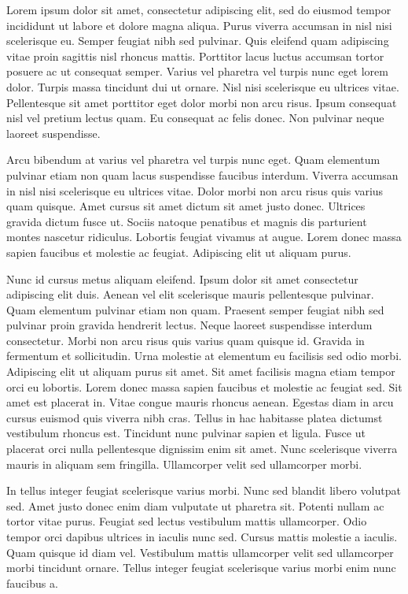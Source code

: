 Lorem ipsum dolor sit amet, consectetur adipiscing elit, sed do eiusmod tempor incididunt ut labore et dolore magna aliqua. Purus viverra accumsan in nisl nisi scelerisque eu. Semper feugiat nibh sed pulvinar. Quis eleifend quam adipiscing vitae proin sagittis nisl rhoncus mattis. Porttitor lacus luctus accumsan tortor posuere ac ut consequat semper. Varius vel pharetra vel turpis nunc eget lorem dolor. Turpis massa tincidunt dui ut ornare. Nisl nisi scelerisque eu ultrices vitae. Pellentesque sit amet porttitor eget dolor morbi non arcu risus. Ipsum consequat nisl vel pretium lectus quam. Eu consequat ac felis donec. Non pulvinar neque laoreet suspendisse.

Arcu bibendum at varius vel pharetra vel turpis nunc eget. Quam elementum pulvinar etiam non quam lacus suspendisse faucibus interdum. Viverra accumsan in nisl nisi scelerisque eu ultrices vitae. Dolor morbi non arcu risus quis varius quam quisque. Amet cursus sit amet dictum sit amet justo donec. Ultrices gravida dictum fusce ut. Sociis natoque penatibus et magnis dis parturient montes nascetur ridiculus. Lobortis feugiat vivamus at augue. Lorem donec massa sapien faucibus et molestie ac feugiat. Adipiscing elit ut aliquam purus.

Nunc id cursus metus aliquam eleifend. Ipsum dolor sit amet consectetur adipiscing elit duis. Aenean vel elit scelerisque mauris pellentesque pulvinar. Quam elementum pulvinar etiam non quam. Praesent semper feugiat nibh sed pulvinar proin gravida hendrerit lectus. Neque laoreet suspendisse interdum consectetur. Morbi non arcu risus quis varius quam quisque id. Gravida in fermentum et sollicitudin. Urna molestie at elementum eu facilisis sed odio morbi. Adipiscing elit ut aliquam purus sit amet. Sit amet facilisis magna etiam tempor orci eu lobortis. Lorem donec massa sapien faucibus et molestie ac feugiat sed. Sit amet est placerat in. Vitae congue mauris rhoncus aenean. Egestas diam in arcu cursus euismod quis viverra nibh cras. Tellus in hac habitasse platea dictumst vestibulum rhoncus est. Tincidunt nunc pulvinar sapien et ligula. Fusce ut placerat orci nulla pellentesque dignissim enim sit amet. Nunc scelerisque viverra mauris in aliquam sem fringilla. Ullamcorper velit sed ullamcorper morbi.

In tellus integer feugiat scelerisque varius morbi. Nunc sed blandit libero volutpat sed. Amet justo donec enim diam vulputate ut pharetra sit. Potenti nullam ac tortor vitae purus. Feugiat sed lectus vestibulum mattis ullamcorper. Odio tempor orci dapibus ultrices in iaculis nunc sed. Cursus mattis molestie a iaculis. Quam quisque id diam vel. Vestibulum mattis ullamcorper velit sed ullamcorper morbi tincidunt ornare. Tellus integer feugiat scelerisque varius morbi enim nunc faucibus a.

